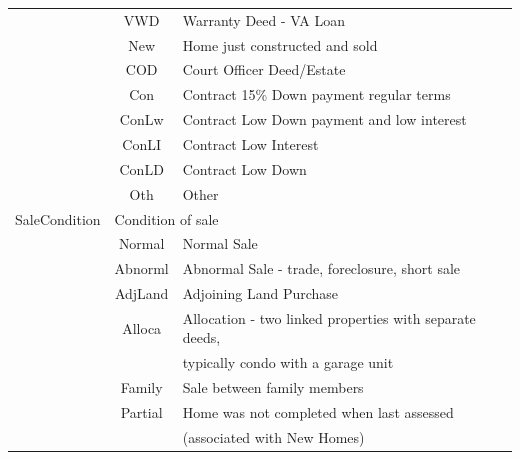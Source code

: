 \documentclass[11pt]{scrartcl} %
\begin{document}
\begin{center}
\begin{tabular}{c c c c c c}
\multicolumn{2}{|c}{} & \multicolumn{1}{c}{VWD} & \multicolumn{3}{l|}{Warranty Deed - VA Loan}\\
\multicolumn{2}{|c}{} & \multicolumn{1}{c}{New} & \multicolumn{3}{l|}{Home just constructed and sold}\\
\multicolumn{2}{|c}{} & \multicolumn{1}{c}{COD} & \multicolumn{3}{l|}{Court Officer Deed/Estate}\\
\multicolumn{2}{|c}{} & \multicolumn{1}{c}{Con} & \multicolumn{3}{l|}{Contract 15\% Down payment regular terms}\\
\multicolumn{2}{|c}{} & \multicolumn{1}{c}{ConLw} & \multicolumn{3}{l|}{Contract Low Down payment and low interest}\\
\multicolumn{2}{|c}{} & \multicolumn{1}{c}{ConLI} & \multicolumn{3}{l|}{Contract Low Interest}\\
\multicolumn{2}{|c}{} & \multicolumn{1}{c}{ConLD} & \multicolumn{3}{l|}{Contract Low Down}\\
\multicolumn{2}{|c}{} & \multicolumn{1}{c}{Oth} & \multicolumn{3}{l|}{Other}\\
\hline
\multicolumn{2}{|c}{SaleCondition} & \multicolumn{4}{l|}{Condition of sale}\\ 
\multicolumn{2}{|c}{} & \multicolumn{1}{c}{Normal} & \multicolumn{3}{l|}{Normal Sale}\\
\multicolumn{2}{|c}{} & \multicolumn{1}{c}{Abnorml} & \multicolumn{3}{l|}{Abnormal Sale -  trade, foreclosure, short sale}\\
\multicolumn{2}{|c}{} & \multicolumn{1}{c}{AdjLand} & \multicolumn{3}{l|}{Adjoining Land Purchase}\\
\multicolumn{2}{|c}{} & \multicolumn{1}{c}{Alloca} & \multicolumn{3}{l|}{Allocation - two linked properties with separate deeds,}\\
\multicolumn{2}{|c}{} & \multicolumn{1}{c}{} & \multicolumn{3}{l|}{typically condo with a garage unit}\\
\multicolumn{2}{|c}{} & \multicolumn{1}{c}{Family} & \multicolumn{3}{l|}{Sale between family members}\\
\multicolumn{2}{|c}{} & \multicolumn{1}{c}{Partial} & \multicolumn{3}{l|}{Home was not completed when last assessed}\\
\multicolumn{2}{|c}{} & \multicolumn{1}{c}{} & \multicolumn{3}{l|}{(associated with New Homes)}\\
\hline
\end{tabular}
\end{center}
\end{document}
